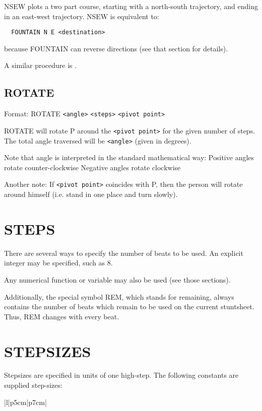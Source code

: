 NSEW plots a two part course, starting with a north-south trajectory, and
ending in an east-west trajectory.  NSEW is equivalent to:
\begin{verbatim}
  FOUNTAIN N E <destination>
\end{verbatim}
because FOUNTAIN can reverse directions (see that section for details).

A similar procedure is .

\subsection{ROTATE}\label{rotate}

Format: ROTATE \verb$<angle>$ \verb$<steps>$ \verb$<pivot point>$

ROTATE will rotate P around the \verb$<pivot point>$ for the given
number of steps.  The total angle traversed will be \verb$<angle>$ (given in
degrees).

Note that angle is interpreted in the standard mathematical way:
  Positive angles rotate counter-clockwise
  Negative angles rotate clockwise

Another note:  If \verb$<pivot point>$ coincides with P, then the person will
rotate around himself (i.e. stand in one place and turn slowly).

\section{STEPS}\label{steps}

There are several ways to specify the number of beats to be used.  An
explicit integer may be specified, such as 8.

Any numerical function or variable may also be used (see those sections).

Additionally, the special symbol REM, which stands for remaining, always
contains the number of beats which remain to be used on the current
stuntsheet.  Thus, REM changes with every beat.

\section{STEPSIZES}\label{stepsizes}

Stepsizes are specified in units of one high-step.  The following constants
are supplied step-sizes:

\begin{tabular}{|l|p{5cm}|p{7cm}|}\hline
{}\hline\hline
{}
\end{tabular}

